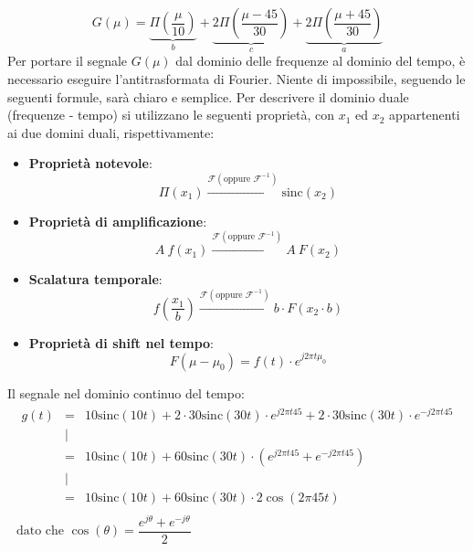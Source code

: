 \documentclass[a4paper]{article}
\begin{document}
	\begin{equation*}
		G\left(\mu\right) = \underbrace{\Pi\left(\dfrac{\mu}{10}\right)}_{b} + \underbrace{2\Pi\left(\dfrac{\mu - 45}{30}\right)}_{c} + \underbrace{2\Pi\left(\dfrac{\mu + 45}{30}\right)}_{a}
	\end{equation*}
	Per portare il segnale $G\left(\mu\right)$ dal dominio delle frequenze al dominio del tempo, è necessario eseguire l'antitrasformata di Fourier. Niente di impossibile, seguendo le seguenti formule, sarà chiaro e semplice.\newline
	Per descrivere il dominio duale (frequenze - tempo) si utilizzano le seguenti proprietà, con $x_{1}$ ed $x_{2}$ appartenenti ai due domini duali, rispettivamente:
	\begin{itemize}
		\item \textbf{Proprietà notevole}:
		\begin{equation*}
			\Pi\left(x_{1}\right) \xrightarrow{\mathscr{F}\left(\text{oppure } \mathscr{F}^{-1}\right)} \mathrm{sinc}\left(x_{2}\right)
		\end{equation*}
		
		\item \textbf{Proprietà di amplificazione}:
		\begin{equation*}
			A \: f\left(x_{1}\right) \xrightarrow{\mathscr{F}\left(\text{oppure } \mathscr{F}^{-1}\right)} A \: F\left(x_{2}\right)
		\end{equation*}
		
		\item \textbf{Scalatura temporale}:
		\begin{equation*}
			f\left(\dfrac{x_{1}}{b}\right) \xrightarrow{\mathscr{F}\left(\text{oppure } \mathscr{F}^{-1}\right)} b \cdot F\left(x_{2} \cdot b\right)
		\end{equation*}
		
		\item \textbf{Proprietà di shift nel tempo}:
		\begin{equation*}
			F\left(\mu - \mu_{0}\right) = f\left(t\right) \cdot e^{j2\pi t \mu_{0}}
		\end{equation*}
	\end{itemize}
	Il segnale nel dominio continuo del tempo:
	\begin{gather*}
		\begin{array}{lcl}
			g\left(t\right) & = & 10\mathrm{sinc}\left(10t\right) + 2 \cdot 30\mathrm{sinc}\left(30t\right) \cdot e^{j 2 \pi t 45} + 2 \cdot 30\mathrm{sinc}\left(30t\right) \cdot e^{-j 2 \pi t 45} \\
			&|& \\
			& = & 10\mathrm{sinc}\left(10t\right) + 60\mathrm{sinc}\left(30t\right) \cdot \left(e^{j 2 \pi t 45} + e^{-j 2 \pi t 45}\right) \\
			&|& \\
			& = & 10\mathrm{sinc}\left(10t\right) + 60\mathrm{sinc}\left(30t\right) \cdot 2\cos\left(2\pi 45 t\right)
		\end{array}\\
		\text{dato che } \cos\left(\theta\right) = \dfrac{e^{j\theta} + e^{-j \theta}}{2}
	\end{gather*}\newpage
	
\end{document}
